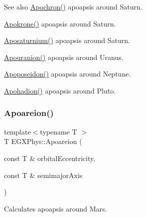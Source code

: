 \begin{DoxySeeAlso}{See also}
\mbox{\hyperlink{group___e_g_x_phys-_apoapsis_gae4ea146039e6f32022321f0998e715e8}{Apochron()}} apoapsis around Saturn. 

\mbox{\hyperlink{group___e_g_x_phys-_apoapsis_ga98557a8d49aa129c29e652c4758334d1}{Apokrone()}} apoapsis around Saturn. 

\mbox{\hyperlink{group___e_g_x_phys-_apoapsis_gac157adc20a88c8616e4822eb819f9016}{Aposaturnium()}} apoapsis around Saturn. 

\mbox{\hyperlink{group___e_g_x_phys-_apoapsis_ga6efaf5c9379f1085fa6e51bf97356124}{Apouranion()}} apoapsis around Uranus. 

\mbox{\hyperlink{group___e_g_x_phys-_apoapsis_ga89679654fff13176e989536163a27f9d}{Apoposeidon()}} apoapsis around Neptune. 

\mbox{\hyperlink{group___e_g_x_phys-_apoapsis_gaa16847ddc5763c327067075dcb6a3353}{Apohadion()}} apoapsis around Pluto. 
\end{DoxySeeAlso}
\mbox{\label{group___e_g_x_phys-_apoapsis_ga8d8ac5814f653e229e1d463b432ffca5}} 
\subsubsection{\texorpdfstring{Apoareion()}{Apoareion()}}
{\footnotesize\ttfamily template$<$typename T $>$ \\
T E\+G\+X\+Phys\+::\+Apoareion (\begin{DoxyParamCaption}\item[{const T \&}]{orbital\+Eccentricity,  }\item[{const T \&}]{semimajor\+Axis }\end{DoxyParamCaption})}



Calculates apoapsis around Mars. 


